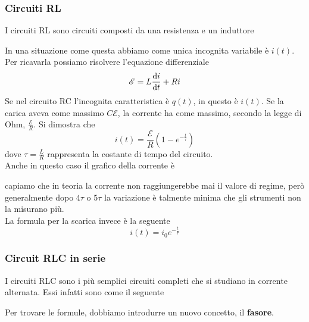 \subsubsection{Circuiti RL}
I circuiti RL sono circuiti composti da una resistenza e un induttore
\begin{center}
\end{center}
In una situazione come questa abbiamo come unica incognita variabile è $i(t)$. Per ricavarla 
possiamo risolvere l'equazione differenziale
\begin{equation*}
  \mathcal{E} = L \frac{\mathop{}\!\mathrm{d} i}{\mathop{}\!\mathrm{d} t}+Ri
\end{equation*}
Se nel circuito RC l'incognita caratteristica è
$q(t)$, in questo è $i(t)$. Se la carica aveva come massimo $C\mathcal{E}$, la corrente ha
come massimo, secondo la legge di Ohm, $\frac{\mathcal{E}}{R}$. Si dimostra che
\begin{equation*}
  i(t) = \frac{\mathcal{E}}{R} \left( 1-e^{-\frac{t}{\tau}} \right)
\end{equation*}
dove $\tau = \frac{L}{R}$ rappresenta la costante di tempo del circuito.\\
Anche in questo caso il grafico della corrente è
\begin{center}
\end{center}
capiamo che in teoria la corrente non raggiungerebbe mai il valore di regime, però generalmente
dopo $4\tau$ o $5\tau$ la variazione è talmente minima che gli strumenti non la misurano più.\\
La formula per la scarica invece è la seguente
\begin{equation*}
  i(t) = i_0e^{-\frac{t}{\tau}}
\end{equation*}

\subsubsection{Circuit RLC in serie}
I circuiti RLC sono i più semplici circuiti completi che si studiano in corrente alternata. Essi 
infatti sono come il seguente
\begin{center}
\end{center}
Per trovare le formule, dobbiamo introdurre un nuovo concetto, il \textbf{fasore}.
